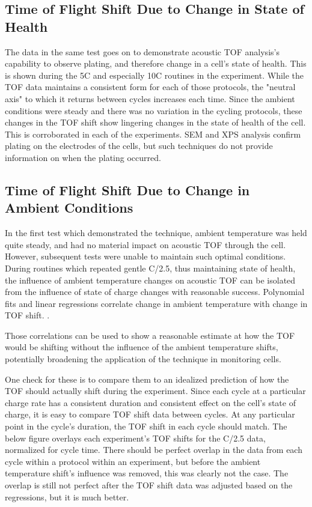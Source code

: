 \subsection{Time of Flight Shift Due to Change in State of Health}
The data in the same test goes on to demonstrate acoustic TOF analysis's capability to observe plating, and therefore change in a cell's state of health. This is shown during the 5C and especially 10C routines in the experiment. 
While the TOF data maintains a consistent form for each of those protocols, the "neutral axis" to which it returns between cycles increases each time. 
Since the ambient conditions were steady and there was no variation in the cycling protocols, these changes in the TOF shift show lingering changes in the state of health of the cell. 
This is corroborated in each of the experiments. 
SEM and XPS analysis confirm plating on the electrodes of the cells, but such techniques do not provide information on when the plating occurred.


\subsection{Time of Flight Shift Due to Change in Ambient Conditions}
In the first test which demonstrated the technique, ambient temperature was held quite steady, and had no material impact on acoustic TOF through the cell. 
However, subsequent tests were unable to maintain such optimal conditions.
During routines which repeated gentle C/2.5, thus maintaining state of health, the influence of ambient temperature changes on acoustic TOF can be isolated from the influence of state of charge changes with reasonable success. Polynomial fits and linear regressions correlate change in ambient temperature with change in TOF shift. .

Those correlations can be used to show a reasonable estimate at how the TOF would be shifting without the influence of the ambient temperature shifts, potentially broadening the application of the technique in monitoring cells.

One check for these is to compare them to an idealized prediction of how the TOF should actually shift during the experiment. Since each cycle at a particular charge rate has a consistent duration and consistent effect on the cell's state of charge, it is easy to compare TOF shift data between cycles. At any particular point in the cycle's duration, the TOF shift in each cycle should match. The below figure overlays each experiment's TOF shifts for the C/2.5 data, normalized for cycle time. There should be perfect overlap in the data from each cycle within a protocol within an experiment, but before the ambient temperature shift's influence was removed, this was clearly not the case. The overlap is still not perfect after the TOF shift data was adjusted based on the regressions, but it is much better.

